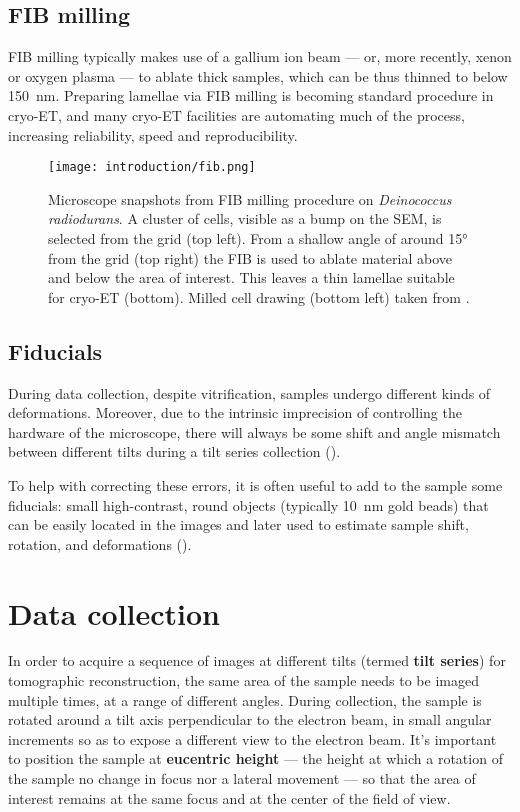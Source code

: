 \subsection{FIB milling}
FIB milling typically makes use of a gallium ion beam --- or, more recently, xenon or oxygen plasma --- to ablate thick samples, which can be thus thinned to below \qty{150}{\nano\meter}.
Preparing lamellae via FIB milling is becoming standard procedure in cryo-ET, and many cryo-ET facilities are automating much of the process, increasing reliability, speed and reproducibility.

\begin{figure}[ht]
    \centering
    \texttt{[image: introduction/fib.png]}
    \caption[FIB milling]{Microscope snapshots from FIB milling procedure on \textit{Deinococcus radiodurans}. A cluster of cells, visible as a bump on the SEM, is selected from the grid (top left). From a shallow angle of around \ang{15} from the grid (top right) the FIB is used to ablate material above and below the area of interest. This leaves a thin lamellae suitable for cryo-ET (bottom). Milled cell drawing (bottom left) taken from \citet{villaOpeningWindowsCell2013}.}
    \label{fig:et_fib_milling}
\end{figure}


\subsection{Fiducials}\label{fiducials}
During data collection, despite vitrification, samples undergo different kinds of deformations.
Moreover, due to the intrinsic imprecision of controlling the hardware of the microscope, there will always be some shift and angle mismatch between different tilts during a tilt series collection ().

To help with correcting these errors, it is often useful to add to the sample some fiducials: small high-contrast, round objects (typically \qty{10}{nm} gold beads) that can be easily located in the images and later used to estimate sample shift, rotation, and deformations ().

\section{Data collection}\label{et_data_collection}
In order to acquire a sequence of images at different tilts (termed \textbf{tilt series}) for tomographic reconstruction, the same area of the sample needs to be imaged multiple times, at a range of different angles.
During collection, the sample is rotated around a tilt axis perpendicular to the electron beam, in small angular increments so as to expose a different view to the electron beam.
It's important to position the sample at \textbf{eucentric height} --- the height at which a rotation of the sample no change in focus nor a lateral movement --- so that the area of interest remains at the same focus and at the center of the field of view.

